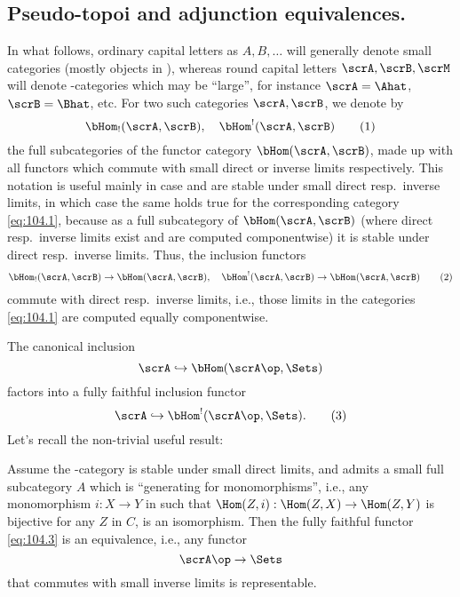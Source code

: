 \subsection{Pseudo-topoi and adjunction equivalences.}
\label{subsec:104.A}
In what follows, ordinary capital letters as $A,B,\ldots$ will
generally denote small categories (mostly objects in \Cat), whereas
round capital letters $\scrA,\scrB,\scrM$ will denote \scrU-categories
which may be ``large'', for instance $\scrA=\Ahat$, $\scrB=\Bhat$,
etc.  For two such categories $\scrA,\scrB$, we denote by
\begin{equation}
  \label{eq:104.1}
  \bHom_!(\scrA,\scrB), \quad \bHom^!(\scrA,\scrB)\tag{1}
\end{equation}
the full subcategories of the functor category $\bHom(\scrA,\scrB)$,
made up with all functors which commute with small direct or inverse
limits respectively. This notation is useful mainly in case \scrA{}
and \scrB{} are stable under small direct resp.\ inverse limits, in
which case the same holds true for the corresponding category
\eqref{eq:104.1}, because as a full subcategory of
$\bHom(\scrA,\scrB)$ (where direct resp.\ inverse limits exist and are
computed componentwise) it is stable under direct resp.\ inverse
limits. Thus, the inclusion functors
\begin{equation}
  \label{eq:104.2}
  \bHom_!(\scrA,\scrB) \to \bHom(\scrA,\scrB),\quad
  \bHom^!(\scrA,\scrB) \to \bHom(\scrA,\scrB)\tag{2}
\end{equation}
commute with direct resp.\ inverse limits, i.e., those limits in the
categories \eqref{eq:104.1} are computed equally componentwise.

The canonical inclusion
\[\scrA \hookrightarrow \bHom(\scrA\op,\Sets)\]
factors into a fully faithful inclusion functor
\begin{equation}
  \label{eq:104.3}
  \scrA \hookrightarrow \bHom^!(\scrA\op,\Sets).\tag{3}
\end{equation}
Let's recall the non-trivial useful result:
\begin{propositionnum}\label{prop:104.1}
  Assume the \scrU-category \scrA{} is stable under small direct
  limits, and admits a small full subcategory $A$ which is
  ``generating for monomorphisms'', i.e., any monomorphism $i:X\to Y$
  in \scrA{} such that $\Hom(Z,i):\Hom(Z,X)\to\Hom(Z,Y)$ is bijective
  for any $Z$ in $C$, is an isomorphism. Then the fully faithful
  functor \eqref{eq:104.3} is an equivalence, i.e., any functor
  \[\scrA\op\to\Sets\]
  that commutes with small inverse limits is representable.
\end{propositionnum}

